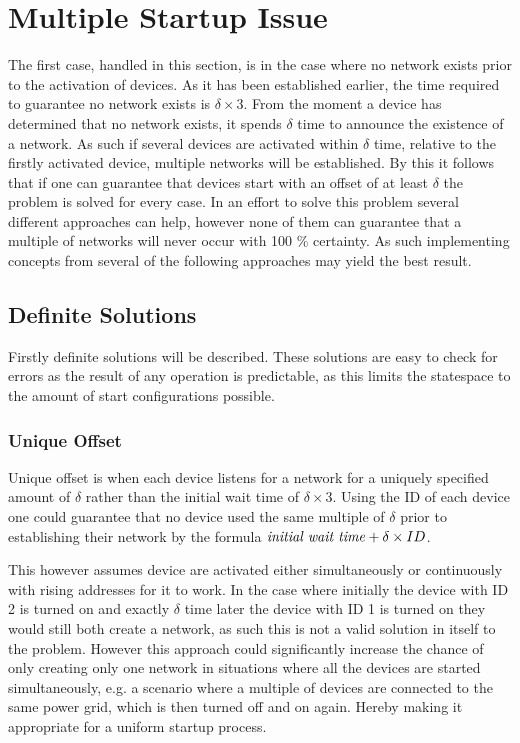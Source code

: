 \section{Multiple Startup Issue}\label{sec:MSI-CCRC}
The first case, handled in this section, is in the case where no network exists prior to the activation of devices.
As it has been established earlier, the time required to guarantee no network exists is $\delta \times 3$.
From the moment a device has determined that no network exists, it spends $\delta$ time to announce the existence of a network.
As such if several devices are activated within $\delta$ time, relative to the firstly activated device, multiple networks will be established.
By this it follows that if one can guarantee that devices start with an offset of at least $\delta$ the problem is solved for every case.
In an effort to solve this problem several different approaches can help, however none of them can guarantee that a multiple of networks will never occur with 100 \% certainty. 
As such implementing concepts from several of the following approaches may yield the best result.

\subsection{Definite Solutions}
Firstly definite solutions will be described.
These solutions are easy to check for errors as the result of any operation is predictable, as this limits the statespace to the amount of start configurations possible.

\subsubsection{Unique Offset}
Unique offset is when each device listens for a network for a uniquely specified amount of $\delta$ rather than the initial wait time of $\delta \times 3$.
Using the ID of each device one could guarantee that no device used the same multiple of $\delta$ prior to establishing their network by the formula $\text{\textit{initial wait time}} + \delta \times ID$.

This however assumes device are activated either simultaneously or continuously with rising addresses for it to work.
In the case where initially the device with ID 2 is turned on and exactly $\delta$ time later the device with ID 1 is turned on they would still both create a network, as such this is not a valid solution in itself to the problem.
However this approach could significantly increase the chance of only creating only one network in situations where all the devices are started simultaneously, e.g. a scenario where a multiple of devices are connected to the same power grid, which is then turned off and on again.
Hereby making it appropriate for a uniform startup process.


